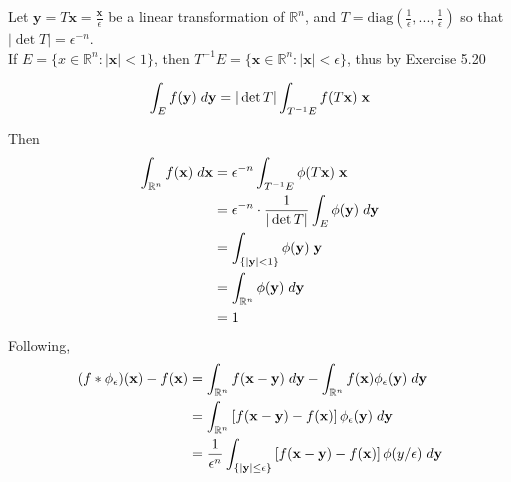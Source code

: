 \documentclass[a4paper,11pt]{article}
\begin{document}
\begin{enumerate}
 		Let $\mathbf{y} = T \mathbf{x} = \frac{\mathbf{x}}{\epsilon}$ be a linear transformation of $\mathbb{R}^n$, and $T = \mbox{diag} (\frac{1}{\epsilon}, ..., \frac{1}{\epsilon})$ so that $|\det T| = \epsilon^{-n}$.\\
 		If $E = \{x \in \mathbb{R}^n : |\mathbf{x}| < 1 \}$, then $T^{-1} E = \{ \mathbf{x} \in \mathbb{R}^n : |\mathbf{x}| < \epsilon\}$, thus by Exercise 5.20

 		$$\int_E f(\mathbf{y}) \hspace{0.1cm} d \mathbf{y}
 		= |\det T| \int_{T^{-1} E} f(T \mathbf{x}) \hspace{0.1cm} \mathbf{x}$$

 		Then
 		$$\begin{aligned}
 		\int_{\mathbb{R}^n} f(\mathbf{x}) \hspace{0.1cm} d \mathbf{x}
 		&= \epsilon^{-n} \int_{T^{-1} E} \phi (T \mathbf{x}) \hspace{0.1cm} \mathbf{x}\\
 		&= \epsilon^{-n} \cdot \frac{1}{|\det T|} \int_E \phi (\mathbf{y}) \hspace{0.1cm} d\mathbf{y}\\
 		&= \int_{\{ |\mathbf{y}|<1 \}} \phi(\mathbf{y}) \hspace{0.1cm} \mathbf{y}\\
 		&= \int_{\mathbb{R}^n} \phi (\mathbf{y}) \hspace{0.1cm} d\mathbf{y}\\
 		&= 1
 		\end{aligned}$$
 		Following,
 		$$\begin{aligned}
 		(f*\phi_\epsilon) (\mathbf{x}) - f(\mathbf{x})
 		&= \int_{\mathbb{R}^n} f(\mathbf{x} - \mathbf{y}) \hspace{0.1cm} d\mathbf{y} - \int_{\mathbb{R}^n} f(\mathbf{x}) \phi_\epsilon (\mathbf{y}) \hspace{0.1cm} d\mathbf{y}\\
 		&= \int_{\mathbb{R}^n} \left[ f(\mathbf{x} - \mathbf{y}) - f(\mathbf{x}) \right] \phi_\epsilon (\mathbf{y}) \hspace{0.1cm} d \mathbf{y}\\
 		&= \frac{1}{\epsilon^n} \int_{\{ |\mathbf{y}| \leq \epsilon \}} \left[ f(\mathbf{x} - \mathbf{y}) - f(\mathbf{x}) \right] \phi(y/\epsilon) \hspace{0.1cm} d \mathbf{y}
 		\end{aligned}$$


\end{enumerate}
\end{document}
